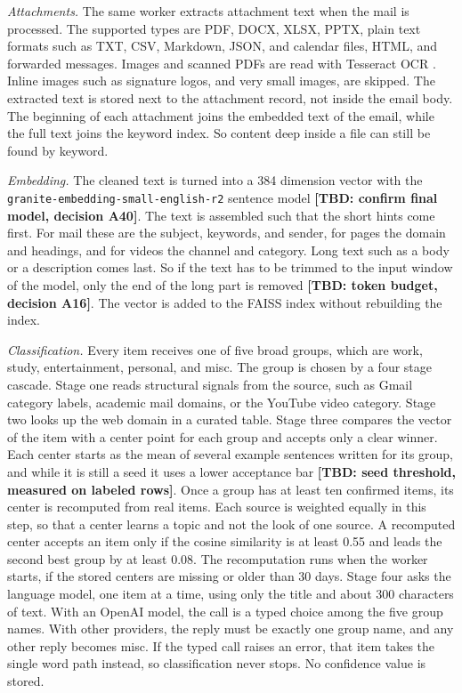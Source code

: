 \documentclass[conference]{IEEEtran}
\newcommand{\embmodel}{\texttt{granite\allowbreak-embedding\allowbreak-small\allowbreak-english\allowbreak-r2}}
\newcommand{\embdim}{384}
\newcommand{\tbd}[1]{\textbf{[TBD: #1]}}
\begin{document}
\textit{Attachments.} The same worker extracts attachment text when the mail is processed. The supported types are PDF, DOCX, XLSX, PPTX, plain text formats such as TXT, CSV, Markdown, JSON, and calendar files, HTML, and forwarded messages. Images and scanned PDFs are read with Tesseract OCR \cite{b15}. Inline images such as signature logos, and very small images, are skipped. The extracted text is stored next to the attachment record, not inside the email body. The beginning of each attachment joins the embedded text of the email, while the full text joins the keyword index. So content deep inside a file can still be found by keyword.

\textit{Embedding.} The cleaned text is turned into a \embdim{} dimension vector with the \embmodel{} sentence model \tbd{confirm final model, decision A40}. The text is assembled such that the short hints come first. For mail these are the subject, keywords, and sender, for pages the domain and headings, and for videos the channel and category. Long text such as a body or a description comes last. So if the text has to be trimmed to the input window of the model, only the end of the long part is removed \tbd{token budget, decision A16}. The vector is added to the FAISS index without rebuilding the index.

\textit{Classification.} Every item receives one of five broad groups, which are work, study, entertainment, personal, and misc. The group is chosen by a four stage cascade. Stage one reads structural signals from the source, such as Gmail category labels, academic mail domains, or the YouTube video category. Stage two looks up the web domain in a curated table. Stage three compares the vector of the item with a center point for each group and accepts only a clear winner. Each center starts as the mean of several example sentences written for its group, and while it is still a seed it uses a lower acceptance bar \tbd{seed threshold, measured on labeled rows}. Once a group has at least ten confirmed items, its center is recomputed from real items. Each source is weighted equally in this step, so that a center learns a topic and not the look of one source. A recomputed center accepts an item only if the cosine similarity is at least 0.55 and leads the second best group by at least 0.08. The recomputation runs when the worker starts, if the stored centers are missing or older than 30 days. Stage four asks the language model, one item at a time, using only the title and about 300 characters of text. With an OpenAI model, the call is a typed choice among the five group names. With other providers, the reply must be exactly one group name, and any other reply becomes misc. If the typed call raises an error, that item takes the single word path instead, so classification never stops. No confidence value is stored.
\end{document}
